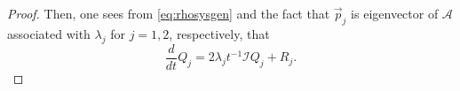 \documentclass[11pt,a4paper,twosides]{amsart}
\theoremstyle{plain}
\theoremstyle{remark}
\numberwithin{equation}{section}
\theoremstyle{definition}
\newcommand{\1}{{\bf 1}_{\{|x| < |t|\}}}
\renewcommand{\tilde}{\widetilde}
\begin{document}
\begin{proof}
Then, one sees from \eqref{eq:rhosysgen} and the fact that $\vec{p}_j$ is eigenvector 
of $\mathscr{A}$ associated with $\lambda_j$ for $j=1,2$, respectively, that
\begin{equation}\label{eq:tildeode}
	\frac{d}{dt} Q_j = 2\lambda_j t^{-1} \mathcal{I} Q_j + R_j.
\end{equation}

\end{proof}
\end{document}

